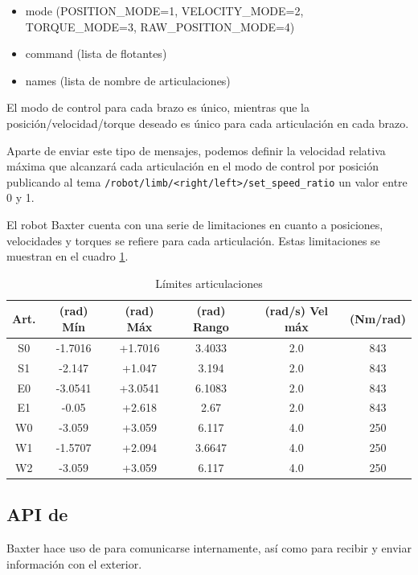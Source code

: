 \begin{itemize}
\item mode (POSITION\_MODE=1, VELOCITY\_MODE=2,\\TORQUE\_MODE=3, RAW\_POSITION\_MODE=4)
\item command (lista de flotantes)
\item names (lista de nombre de articulaciones)
\end{itemize}

El modo de control para cada brazo es único, mientras que la posición/velocidad/torque deseado es único para cada articulación en cada brazo.

Aparte de enviar este tipo de mensajes, podemos definir la velocidad relativa máxima que alcanzará cada articulación en el modo de control por posición publicando al tema \texttt{/robot/limb/<right/left>/set\_speed\_ratio} un valor entre 0 y 1.

El robot Baxter cuenta con una serie de limitaciones en cuanto a posiciones, velocidades y torques se refiere para cada articulación. Estas limitaciones se muestran en el cuadro \ref{tab:desarrollo/limits}.

\begin{table}[]
\centering
\caption{Límites articulaciones}
\label{tab:desarrollo/limits}
\begin{tabular}{cccccc}
Art.                    & (rad) Mín & (rad) Máx & (rad) Rango & (rad/s) Vel máx & (Nm/rad) \\ \hline
\multicolumn{1}{c|}{S0} & -1.7016   & +1.7016   & 3.4033      & 2.0             & 843      \\
\multicolumn{1}{c|}{S1} & -2.147    & +1.047    & 3.194       & 2.0             & 843      \\
\multicolumn{1}{c|}{E0} & -3.0541   & +3.0541   & 6.1083      & 2.0             & 843      \\
\multicolumn{1}{c|}{E1} & -0.05     & +2.618    & 2.67        & 2.0             & 843      \\
\multicolumn{1}{c|}{W0} & -3.059    & +3.059    & 6.117       & 4.0             & 250      \\
\multicolumn{1}{c|}{W1} & -1.5707   & +2.094    & 3.6647      & 4.0             & 250      \\
\multicolumn{1}{c|}{W2} & -3.059    & +3.059    & 6.117       & 4.0             & 250     
\end{tabular}
\end{table}

\subsection{API de \ros}\label{sec:api-de-ros}
Baxter hace uso de \ros para comunicarse internamente, así como para recibir y enviar información con el exterior.

